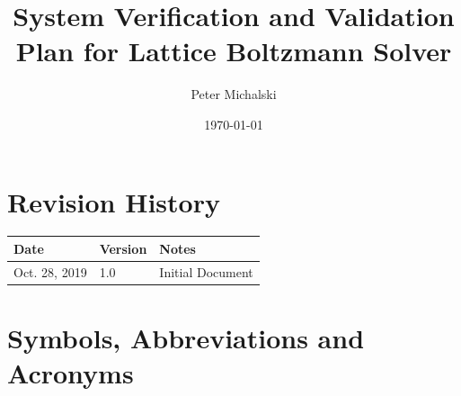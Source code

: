 \documentclass[12pt, titlepage]{article}
\newcommand{\famname}{Lattice Boltzmann Solver}
\begin{document}
\title{System Verification and Validation Plan for \famname} 
\author{Peter Michalski}
\date{\today}
	
\maketitle


\section{Revision History}

\begin{tabularx}{\textwidth}{p{4cm}p{2cm}X}
\toprule {\bf Date} & {\bf Version} & {\bf Notes}\\
\midrule
Oct. 28, 2019 & 1.0 & Initial Document\\
\bottomrule
\end{tabularx}

\newpage

\tableofcontents

\newpage

\listoftables

\listoffigures

\newpage

\section{Symbols, Abbreviations and Acronyms}
\end{document}
